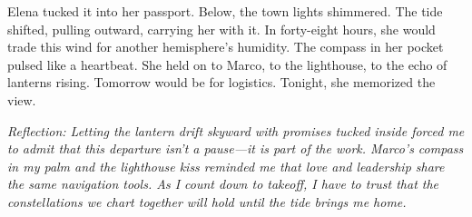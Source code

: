 Elena tucked it into her passport. Below, the town lights shimmered. The tide shifted, pulling outward, carrying her with it. In forty-eight hours, she would trade this wind for another hemisphere's humidity. The compass in her pocket pulsed like a heartbeat. She held on to Marco, to the lighthouse, to the echo of lanterns rising. Tomorrow would be for logistics. Tonight, she memorized the view.

\noindent\textit{Reflection: Letting the lantern drift skyward with promises tucked inside forced me to admit that this departure isn't a pause—it is part of the work. Marco's compass in my palm and the lighthouse kiss reminded me that love and leadership share the same navigation tools. As I count down to takeoff, I have to trust that the constellations we chart together will hold until the tide brings me home.}
